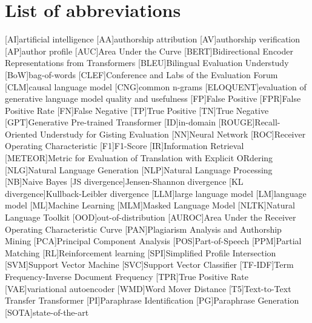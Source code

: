 \chapter*{List of abbreviations}

\begin{acronym}[XXXXXXXXX]
    [AI]{artificial intelligence}
    [AA]{authorship attribution}
    [AV]{authorship verification}
    [AP]{author profile}
    [AUC]{Area Under the Curve}
    [BERT]{Bidirectional Encoder Representations from Transformers}
    [BLEU]{Bilingual Evaluation Understudy}
    [BoW]{bag-of-words}
    [CLEF]{Conference and Labs of the Evaluation Forum}
    [CLM]{causal language model}
    [CNG]{common n-grams}
    [ELOQUENT]{evaluation of generative language model quality and usefulness}
    [FP]{False Positive}
    [FPR]{False Positive Rate}
    [FN]{False Negative}
    [TP]{True Positive}
    [TN]{True Negative}
    [GPT]{Generative Pre-trained Transformer}
    [ID]{in-domain}
    [ROUGE]{Recall-Oriented Understudy for Gisting Evaluation}
    [NN]{Neural Network}
    [ROC]{Receiver Operating Characteristic}
    [F1]{F1-Score}
    [IR]{Information Retrieval}
    [METEOR]{Metric for Evaluation of Translation with Explicit ORdering}
    [NLG]{Natural Language Generation}
    [NLP]{Natural Language Processing}
    [NB]{Naive Bayes}
    [JS divergence]{Jensen-Shannon divergence}
    [KL divergence]{Kullback-Leibler divergence}
    [LLM]{large language model}
    [LM]{language model}
    [ML]{Machine Learning}
    [MLM]{Masked Language Model}
    [NLTK]{Natural Language Toolkit}
    [OOD]{out-of-distribution}
    [AUROC]{Area Under the Receiver Operating Characteristic Curve}
    [PAN]{Plagiarism Analysis and Authorship Mining} %
    [PCA]{Principal Component Analysis}
    [POS]{Part-of-Speech}
    [PPM]{Partial Matching}
    [RL]{Reinforcement learning}
    [SPI]{Simplified Profile Intersection}
    [SVM]{Support Vector Machine}
    [SVC]{Support Vector Classifier}
    [TF-IDF]{Term Frequency-Inverse Document Frequency}
    [TPR]{True Positive Rate}
    [VAE]{variational autoencoder}
    [WMD]{Word Mover Distance}
    [T5]{Text-to-Text Transfer Transformer}
    [PI]{Paraphrase Identification}
    [PG]{Paraphrase Generation}
    [SOTA]{state-of-the-art}

\end{acronym}
